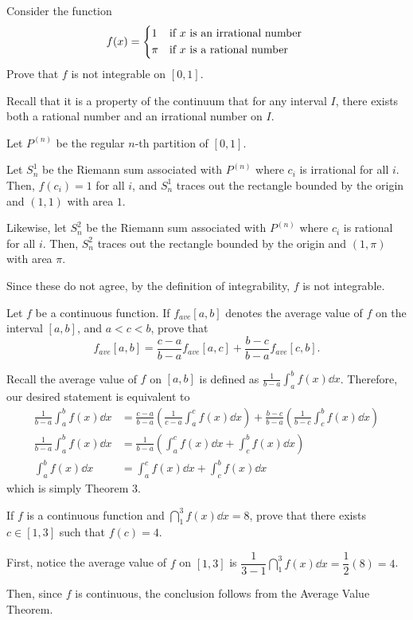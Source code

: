 \documentclass{agony}
\begin{document}
\begin{prob}
  Consider the function
  \[ f(x) = \begin{cases*}
      1   & if $x$ is an irrational number \\
      \pi & if $x$ is a rational number
    \end{cases*} \]
  Prove that $f$ is not integrable on $[0, 1]$.
\end{prob}
\begin{prf}
  Recall that it is a property of the continuum that for any interval $I$,
  there exists both a rational number and an irrational number on $I$.

  Let $P^{(n)}$ be the regular $n$-th partition of $[0, 1]$.

  Let $S_n^1$ be the Riemann sum associated with $P^{(n)}$ where $c_i$ is irrational for all $i$.
  Then, $f(c_i) = 1$ for all $i$, and $S_n^1$ traces out the rectangle
  bounded by the origin and $(1,1)$ with area $1$.

  Likewise, let $S_n^2$ be the Riemann sum associated with $P^{(n)}$
  where $c_i$ is rational for all $i$.
  Then, $S_n^2$ traces out the rectangle bounded by the origin and $(1, \pi)$ with area $\pi$.

  Since these do not agree, by the definition of integrability, $f$ is not integrable.
\end{prf}

\begin{prob}
  Let $f$ be a continuous function.
  If $f_{ave}[a,b]$ denotes the average value of $f$ on the interval $[a,b]$,
  and $a < c < b$, prove that
  \[ f_{ave}[a,b] = \frac{c-a}{b-a}f_{ave}[a,c] + \frac{b-c}{b-a}f_{ave}[c,b]. \]
\end{prob}
\begin{prf}
  Recall the average value of $f$ on $[a,b]$ is defined as $\frac{1}{b-a}\int_a^b f(x) \dd{x}$.
  Therefore, our desired statement is equivalent to
  \begin{align*}
    \frac{1}{b-a}\int_a^b f(x) \dd{x} & = \frac{c-a}{b-a}\left(\frac{1}{c-a}\int_a^c f(x) \dd{x}\right) + \frac{b-c}{b-a}\left(\frac{1}{b-c}\int_c^b f(x) \dd{x}\right) \\
    \frac{1}{b-a}\int_a^b f(x) \dd{x} & = \frac{1}{b-a}\left(\int_a^c f(x) \dd{x} +\int_c^b f(x) \dd{x}\right)                                                          \\
    \int_a^b f(x) \dd{x}              & = \int_a^c f(x) \dd{x} +\int_c^b f(x) \dd{x}
  \end{align*}
  which is simply Theorem 3.
\end{prf}

\begin{prob}
  If $f$ is a continuous function and $\dint_1^3 f(x) \dd{x} = 8$,
  prove that there exists $c\in[1,3]$ such that $f(c) = 4$.
\end{prob}
\begin{prf}
  First, notice the average value of $f$ on $[1,3]$ is
  $\dfrac{1}{3-1}\dint_1^3 f(x) \dd{x} = \dfrac12(8) = 4$.
  
  Then, since $f$ is continuous,
  the conclusion follows from the Average Value Theorem.
\end{prf}
\end{document}
